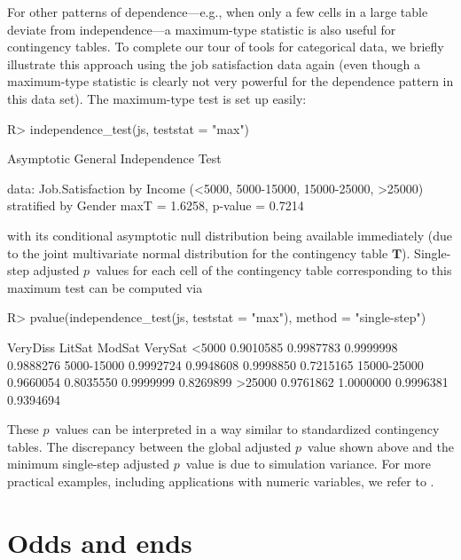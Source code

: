 \documentclass[article]{jss}
\newcommand{\T}{\mathbf{T}}
\begin{document}
For other patterns of dependence---e.g., when only a few cells in a large table deviate
from independence---a maximum-type statistic is also useful for contingency tables.
To complete our tour of  tools for categorical data, we briefly illustrate
this approach using the job satisfaction data again (even though a maximum-type statistic is
clearly not very powerful for the dependence pattern in this data set).
The maximum-type test is set up  easily:
\begin{Schunk}
\begin{Sinput}
R> independence_test(js, teststat = "max")
\end{Sinput}
\begin{Soutput}
	Asymptotic General Independence Test

data:  Job.Satisfaction by
	 Income (<5000, 5000-15000, 15000-25000, >25000) 
	 stratified by Gender 
maxT = 1.6258, p-value = 0.7214
\end{Soutput}
\end{Schunk}
with its conditional asymptotic null distribution being 
available immediately (due to the joint multivariate normal distribution
for the contingency table $\T$). Single-step adjusted $p$~values for each
cell of the contingency table corresponding to this maximum test
can be computed via
\begin{Schunk}
\begin{Sinput}
R> pvalue(independence_test(js, teststat = "max"), method = "single-step")
\end{Sinput}
\begin{Soutput}
             VeryDiss    LitSat    ModSat   VerySat
<5000       0.9010585 0.9987783 0.9999998 0.9888276
5000-15000  0.9992724 0.9948608 0.9998850 0.7215165
15000-25000 0.9660054 0.8035550 0.9999999 0.8269899
>25000      0.9761862 1.0000000 0.9996381 0.9394694
\end{Soutput}
\end{Schunk}
These $p$~values can be interpreted in a way similar to 
standardized contingency tables. The discrepancy between the
global adjusted $p$~value shown above and the minimum single-step
adjusted $p$~value is due to simulation variance. 
For more practical examples, including
applications with numeric variables, we refer to \cite{Hothorn:2006:AmStat}.



\section{Odds and ends} \label{sec:oddsandends}
\end{document}
